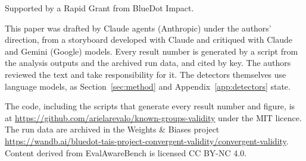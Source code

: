\begin{aespubliconly}
Supported by a Rapid Grant from BlueDot Impact.
\end{aespubliconly}

This paper was drafted by Claude agents (Anthropic) under the authors' direction, from a
storyboard developed with Claude and critiqued with Claude and Gemini (Google) models.
Every result number is generated by a script from the analysis outputs and the archived
run data, and cited by key. The authors reviewed the text and take responsibility for it.
The detectors themselves use language models, as Section~\ref{sec:method} and
Appendix~\ref{app:detectors} state.

The code, including the scripts that generate every result number and figure, is at
\url{https://github.com/arielarevalo/known-groups-validity} under the MIT
licence. The run data are archived in the Weights \& Biases project
\url{https://wandb.ai/bluedot-tais-project-convergent-validity/convergent-validity}. Content derived
from EvalAwareBench \citep{li2026decomposing} is licensed CC BY-NC 4.0.
